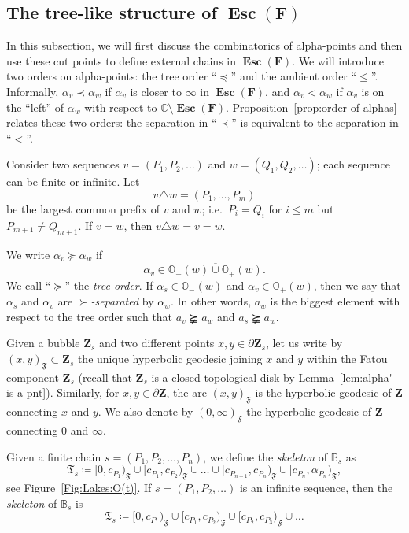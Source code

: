 \documentclass{amsart}
\newcommand{\1}{{\mathbb 1 }}
\newcommand\binfty{{\infty}}%
\newcommand{\skel}{{\mathfrak T}}
\newcommand{\bB}{{\mathbb{B}}}
\newcommand{\bO}{{\mathbb{O}}}
\newcommand\mF{\mathfrak{F}}
\newcommand{\bF}{{\mathbf F}}
\newcommand{\bZ}{{\mathbf Z}}
\newcommand{\C}{\mathbb{C}}
\theoremstyle{remark}
\numberwithin{equation}{section}
\theoremstyle{definition}
\newcommand{\Esc}{{\boldsymbol{\operatorname{Esc}}}}
\theoremstyle{nonumberbreak}
\begin{document}
\subsection{The tree-like structure of $\Esc(\bF)$}
\label{ss:TreeLike str} In this subsection, we will first discuss the combinatorics of alpha-points and then use these cut points to define external chains in $\Esc(\bF)$. We will introduce two orders on alpha-points: the tree order ``$\preceq$'' and the ambient order ``$\le$''. Informally, $\alpha_v\prec \alpha_w$ if $\alpha_v$ is closer to $\infty$ in $\Esc(\bF)$, and $\alpha_v< \alpha_w$ if $\alpha_v$ is on the ``left'' of $\alpha_w$ with respect to $\C\setminus \Esc(\bF)$. Proposition~\ref{prop:order of alphas} relates these two orders: the separation in ``$\prec$'' is equivalent to the separation in ``$<$''. 

Consider two sequences $v=(P_1,P_2,\dots )$ and $w=(Q_1,Q_2,\dots)$; each sequence can be finite or infinite. Let 
\[v\triangle w= (P_1,\dots, P_m)\] be the largest common prefix of $v$ and $w$; i.e.~$P_i=Q_i$ for $i\le m$ but $P_{m+1}\not=Q_{m+1}$. If $v=w$, then $v\triangle w= v=w$.  



 We write $\alpha_v\succeq\alpha_w$ if
\[\alpha_v \in \overline{\bO_-(w)\cup \bO_+(w)}.\]
We call ``$\succeq$'' the \emph{tree order}. If $\alpha_s\in \bO_-(w)$ and $\alpha_v\in \bO_+(w)$, then we say that $\alpha_s$ and $\alpha_v$ are \emph{$\succ$-separated} by $\alpha_w$. In other words, $a_w$ is the biggest element with respect to the tree order such that $a_v\succneqq a_w$ and $a_s\succneqq a_w$.


Given a bubble $\bZ_s$ and two different points $x,y\in \partial \bZ_s$, let us write by 
$(x,y)_{\mF}\subset \bZ_s$ the unique hyperbolic geodesic joining $x$ and $y$ within the Fatou component $\bZ_s$ (recall that $\overline \bZ_s$ is a closed topological disk by Lemma~\ref{lem:alpha' is a pnt}). Similarly, for $x,y\in \partial \bZ$, the arc $(x,y)_{\mF}$ is the hyperbolic geodesic of $\bZ$ connecting $x$ and $y$. We also denote by $(0,\binfty)_{\mF}$ the hyperbolic geodesic of $\bZ$ connecting $0$ and $\binfty$. 

 Given a finite chain $s=(P_1,P_2,\dots, P_n)$, we define the \emph{skeleton} of $\bB_s$ as
\[\skel_s \coloneqq [0,c_{P_1})_{\mF} \cup [c_{P_1},c_{P_2})_{\mF}\cup \dots\cup  [c_{P_{n-1}},c_{P_n})_{\mF}\cup [c_{P_n}, \alpha_{P_n})_{\mF},\]
see Figure~\ref{Fig:Lakes:O(t)}. If $s=(P_1,P_2,\dots )$ is an infinite sequence, then the \emph{skeleton} of $\bB_s$ is
\[\skel_s \coloneqq [0,c_{P_1})_{\mF} \cup [c_{P_1},c_{P_2})_{\mF}\cup  [c_{P_{2}},c_{P_3})_{\mF}\cup \dots\]
\end{document}

